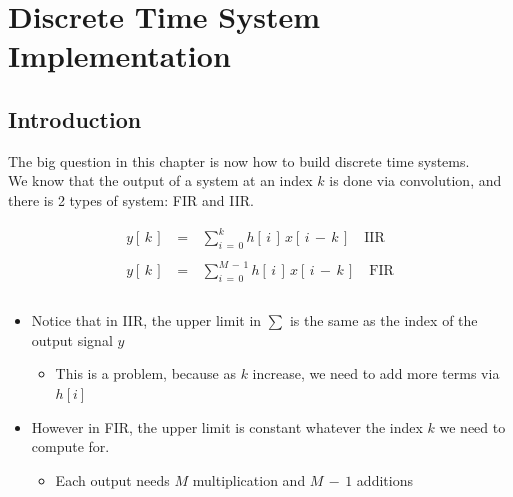 


\chapter{Discrete Time System Implementation}

\section{Introduction}

The big question in this chapter is now how to build discrete time systems.\\

We know that the output of a system at an index $k$ is done via convolution, and there is 2 types of system: FIR and IIR.

\begin{equation}
\begin{array}{rcl}
y[\, k \,] \, &=& \, \displaystyle\sum\limits_{i \, = \, 0}^{k} h[\, i\,] \, x[ \, i \, - \, k \, ] \quad \text{IIR} \\ \\
y[ \, k \,] \, &=& \, \displaystyle\sum\limits_{i \, = \, 0}^{M \, - \, 1} h[\,i \,] \, x[\, i \, - \, k \, ] \quad \text{FIR} \\ \\
\end{array}
\end{equation}


\begin{itemize}

\item Notice that in IIR, the upper limit in $\displaystyle\sum $ is the same as the index of the output signal $y$

	\begin{itemize}
	\item This is a problem, because as $k$ increase, we need to add more terms via $h[i]$
	\end{itemize}

\item However in FIR, the upper limit is constant whatever the index $k$ we need to compute for.

	\begin{itemize}
	\item Each output needs $M$ multiplication and $M \, - \, 1$ additions
	\end{itemize}

\end{itemize}

